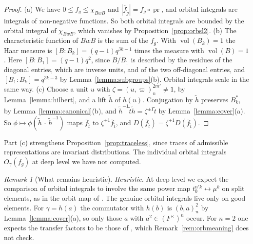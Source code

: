 \documentclass[12pt,letterpaper]{amsart}
\numberwithin{equation}{section}
\theoremstyle{definition}
\theoremstyle{remark}
\newtheorem{vremark}{Remark}
\DeclareMathOperator{\vol}{vol}
\DeclareMathOperator{\pr}{pr}
\newcommand{\fbar}{\overline{f}}
\begin{document}
\begin{proof}
(a) We have $0\leq f_g\leq\chi_{BwB}$ and
$|\fbar_{\tilde g}|=f_g\circ\pr$, and orbital integrals are integrals
of non-negative functions. So both orbital integrals are bounded by
the orbital integral of $\chi_{BwB}$, which vanishes by
Proposition~\ref{prop:orbsl2}. (b) The characteristic function of
$BwB$ is the sum of the $f_g$. With $\vol(B_k)=1$ the Haar measure is
$[B:B_k]=(q-1)q^{3k-1}$ times the measure with $\vol(B)=1$. Here
$[B:B_1]=(q-1)q^2$, since $B/B_1$ is described by the residues of the
diagonal entries, which are inverse units, and of the two off-diagonal
entries, and $[B_1:B_k]=q^{3k-3}$ by Lemma~\ref{lemma:subgroups}(b).
Orbital integrals scale in the same way. (c) Choose a unit $u$ with $\zeta=(u,\varpi)_n^{2m'}\neq1$, by
Lemma~\ref{lemma:hilbert}, and a lift $\tilde h$ of $h(u)$. Conjugation
by $\tilde h$ preserves $B_k^*$, by Lemma~\ref{lemma:canonical}(b),
and $\tilde h^{-1}\tilde t\tilde h=\zeta^{\pm1}\tilde t$ by
Lemma~\ref{lemma:cover}(a). So $\phi\mapsto\phi(\tilde
h\,\cdot\,\tilde h^{-1})$ maps $\fbar_{\tilde t}$ to
$\zeta^{\pm1}\fbar_{\tilde t}$, and $D(\fbar_{\tilde t})=\zeta^{\pm1}
D(\fbar_{\tilde t})$.
\end{proof}

Part (c) strengthens Proposition~\ref{prop:traceless}, since traces of
admissible representations are invariant distributions. The individual
orbital integrals $O_\gamma(f_g)$ at deep level we have not computed.

\begin{vremark}[What remains heuristic]
\label{vrem:savinaction}
\emph{Heuristic.} At deep level we expect
the comparison of orbital integrals to involve the same power map
$t_0^{n'k}\leftrightarrow\mu^k$ on split elements, as in the orbit map
of \cite{FK86}. The genuine orbital integrals live only on good
elements. For $\gamma=h(a)$ the commutator with $h(b)$ is $(b,a)_n^2$
by Lemma~\ref{lemma:cover}(a), so only those $a$ with
$a^2\in(F^\times)^n$ occur. For $n=2$ one expects the transfer factors
to be those of \cite{Li11}, which Remark~\ref{rem:orbmeaning} does not
check.
\end{vremark}
\end{document}
